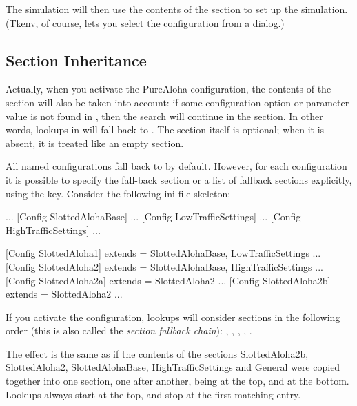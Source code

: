 
The simulation will then use the contents of the 
section to set up the simulation. (Tkenv, of course, lets you select
the configuration from a dialog.)


\subsection{Section Inheritance}

Actually, when you activate the PureAloha configuration, the contents of
the \ttt{[General]} section will also be taken into account: if some
configuration option or parameter value is not found in ,
then the search will continue in the \ttt{[General]} section. In
other words, lookups in  will fall back to \ttt{[General]}.
The \ttt{[General]} section itself is optional; when it is absent, it is
treated like an empty \ttt{[General]} section.

All named configurations fall back to \ttt{[General]} by default. However, for
each configuration it is possible to specify the fall-back section or a list of
fallback sections explicitly, using the  key. Consider the
following ini file skeleton:

\begin{inifile}
[General]
...
[Config SlottedAlohaBase]
...
[Config LowTrafficSettings]
...
[Config HighTrafficSettings]
...

[Config SlottedAloha1]
extends = SlottedAlohaBase, LowTrafficSettings
...
[Config SlottedAloha2]
extends = SlottedAlohaBase, HighTrafficSettings
...
[Config SlottedAloha2a]
extends = SlottedAloha2
...
[Config SlottedAloha2b]
extends = SlottedAloha2
...
\end{inifile}


If you activate the  configuration, lookups will consider
sections in the following order (this is also called the
\textit{section fallback chain}): ,
, , ,
.

The effect is the same as if the contents of the sections
SlottedAloha2b, SlottedAloha2, SlottedAlohaBase, HighTrafficSettings and
General were copied together into one section, one after another,
 being at the top, and \ttt{[General]}
at the bottom. Lookups always start at the top, and stop at the first
matching entry.

